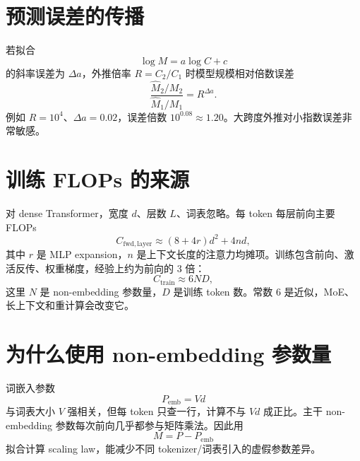 \documentclass[UTF8,12pt,a4paper,fontset=none]{ctexart}
\numberwithin{equation}{section}
\begin{document}
\section{预测误差的传播}
若拟合
\begin{equation}
 \log M=a\log C+c
\end{equation}
的斜率误差为 $\Delta a$，外推倍率 $R=C_2/C_1$ 时模型规模相对倍数误差
\begin{equation}
 \frac{\widehat M_2/M_2}{\widehat M_1/M_1}=R^{\Delta a}.
\end{equation}
例如 $R=10^4$、$\Delta a=0.02$，误差倍数 $10^{0.08}\approx1.20$。大跨度外推对小指数误差非常敏感。

\section{训练 FLOPs 的来源}
对 dense Transformer，宽度 $d$、层数 $L$、词表忽略。每 token 每层前向主要 FLOPs
\begin{equation}
 C_{\mathrm{fwd,layer}}
 \approx(8+4r)d^2+4nd,
\end{equation}
其中 $r$ 是 MLP expansion，$n$ 是上下文长度的注意力均摊项。训练包含前向、激活反传、权重梯度，经验上约为前向的 3 倍：
\begin{equation}
 C_{\mathrm{train}}\approx6ND,
\end{equation}
这里 $N$ 是 non-embedding 参数量，$D$ 是训练 token 数。常数 6 是近似，MoE、长上下文和重计算会改变它。

\section{为什么使用 non-embedding 参数量}
词嵌入参数
\begin{equation}
 P_{\mathrm{emb}}=Vd
\end{equation}
与词表大小 $V$ 强相关，但每 token 只查一行，计算不与 $Vd$ 成正比。主干 non-embedding 参数每次前向几乎都参与矩阵乘法。因此用
\begin{equation}
 M=P-P_{\mathrm{emb}}
\end{equation}
拟合计算 scaling law，能减少不同 tokenizer/词表引入的虚假参数差异。
\end{document}
